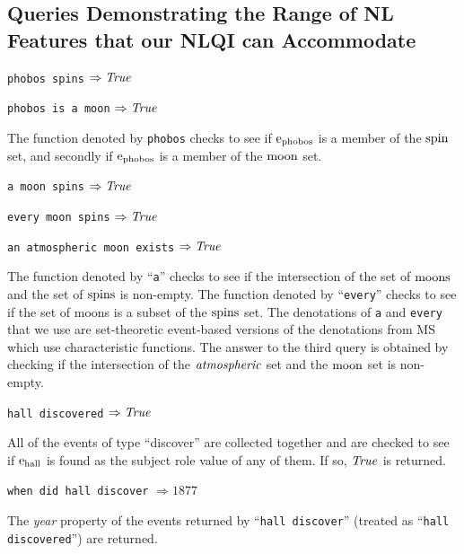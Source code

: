 \documentclass[../main.tex]{subfiles}
\begin{document}
\begin{refsection}
\subsection{Queries Demonstrating the Range of NL Features that our NLQI can Accommodate}
\label{webist2019journal:nlexamples}

\newcommand{\examplespacing}{\vspace{0.5em}}

\texttt{\indent phobos spins} $\Rightarrow \operatorname{\mathit{True}}$

\texttt{phobos is a moon} $\Rightarrow \operatorname{\mathit{True}}$

\examplespacing

\noindent The function denoted by \texttt{phobos} checks to see if $\mathrm{e}_{\operatorname{phobos}}$ is a member of the $\operatorname{spin}$ set, and secondly if $\mathrm{e}_{\operatorname{phobos}}$ is a member of the $\operatorname{moon}$ set.

\examplespacing

\texttt{a moon spins} $\Rightarrow \operatorname{\mathit{True}}$

\texttt{every moon spins} $\Rightarrow \operatorname{\mathit{True}}$

\texttt{an atmospheric moon exists} $\Rightarrow \operatorname{\mathit{True}}$

\examplespacing

\noindent The function denoted by ``\texttt{a}'' checks to see if the intersection of the set of $\operatorname{moons}$ and the set of $\operatorname{spins}$ is non-empty. The function denoted by ``\texttt{every}'' checks to see if the set of moons is a subset of the $\operatorname{spins}$ set. The denotations of \texttt{a} and \texttt{every} that we use are set-theoretic event-based versions of the denotations from MS which use characteristic functions.  The answer to the third query is obtained by checking if the intersection of the $\operatorname{\mathit{atmospheric}}$ set and the $\operatorname{moon}$ set is non-empty.

\examplespacing

\texttt{hall discovered} $\Rightarrow \operatorname{\mathit{True}}$

\examplespacing

\noindent All of the events of type ``discover'' are collected together and are checked to see if $\mathrm{e}_{\operatorname{hall}}$ is found as the subject role value of any of them. If so, $\operatorname{\mathit{True}}$ is returned.

\examplespacing

\texttt{when did hall discover} $\Rightarrow 1877$

\examplespacing

\noindent The {\em year} property of the  events returned by ``\texttt{hall discover}'' (treated as ``\texttt{hall discovered}'') are returned.


\end{refsection}
\end{document}
